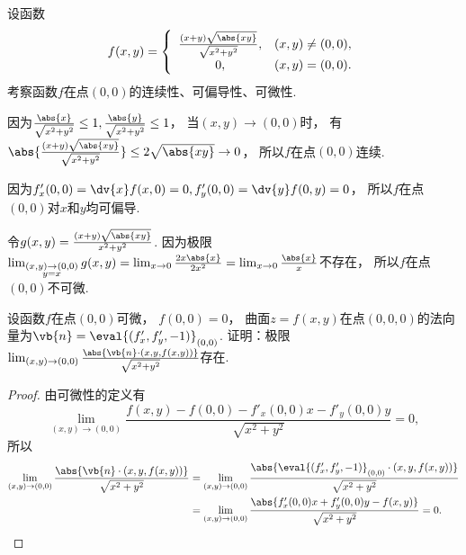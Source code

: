 \begin{example}
设函数\begin{equation*}
	f(x,y) = \left\{ \begin{array}{cl}
		\frac{(x+y) \sqrt{\abs{xy}}}{\sqrt{x^2+y^2}}, & (x,y)\neq(0,0), \\
		0, & (x,y)=(0,0).
	\end{array} \right.
\end{equation*}
考察函数\(f\)在点\((0,0)\)的连续性、可偏导性、可微性.
\begin{solution}
因为\(\frac{\abs{x}}{\sqrt{x^2+y^2}} \leq 1,
\frac{\abs{y}}{\sqrt{x^2+y^2}} \leq 1\)，
当\((x,y)\to(0,0)\)时，
有\(\abs{\frac{(x+y) \sqrt{\abs{xy}}}{\sqrt{x^2+y^2}}}
\leq 2 \sqrt{\abs{xy}}
\to 0\)，
所以\(f\)在点\((0,0)\)连续.

因为\(f'_x(0,0) = \dv{x} f(x,0) = 0,
f'_y(0,0) = \dv{y} f(0,y) = 0\)，
所以\(f\)在点\((0,0)\)对\(x\)和\(y\)均可偏导.

令\(g(x,y) = \frac{(x+y) \sqrt{\abs{xy}}}{x^2+y^2}\).
因为极限\(\lim_{\substack{(x,y)\to(0,0) \\ y=x}} g(x,y)
= \lim_{x\to0} \frac{2x \abs{x}}{2x^2}
= \lim_{x\to0} \frac{\abs{x}}{x}\)不存在，
所以\(f\)在点\((0,0)\)不可微.
\end{solution}
\end{example}

\begin{example}
设函数\(f\)在点\((0,0)\)可微，
\(f(0,0) = 0\)，
曲面\(z = f(x,y)\)在点\((0,0,0)\)的法向量为\(\vb{n} = \eval{(f'_x,f'_y,-1)}_{(0,0)}\).
证明：极限\begin{math}
	\lim_{(x,y)\to(0,0)} \frac{\abs{\vb{n} \cdot (x,y,f(x,y))}}{\sqrt{x^2+y^2}}
\end{math}存在.
\begin{proof}
由可微性的定义有\begin{equation*}
	\lim_{(x,y)\to(0,0)} \frac{
		f(x,y) - f(0,0)
		- f'_x(0,0) x
		- f'_y(0,0) y
	}{
		\sqrt{x^2+y^2}
	}
	= 0,
\end{equation*}
所以\begin{align*}
	\lim_{(x,y)\to(0,0)} \frac{\abs{\vb{n} \cdot (x,y,f(x,y))}}{\sqrt{x^2+y^2}}
	&= \lim_{(x,y)\to(0,0)} \frac{
		\abs{
			\eval{(f'_x,f'_y,-1)}_{(0,0)}
			\cdot
			(x,y,f(x,y))
		}
	}{
		\sqrt{x^2+y^2}
	} \\
	&= \lim_{(x,y)\to(0,0)} \frac{
		\abs{
			f'_x(0,0) x + f'_y(0,0) y - f(x,y)
		}
	}{
		\sqrt{x^2+y^2}
	}
	= 0.
	\qedhere
\end{align*}
\end{proof}
\end{example}

